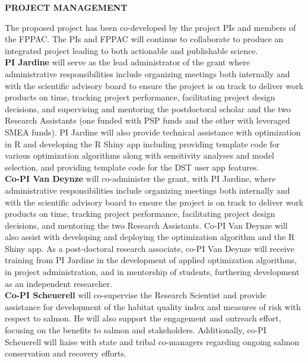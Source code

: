 \begin{center} \textbf{PROJECT MANAGEMENT} \end{center}

The proposed project has been co-developed by the project PIs and members of the FPPAC. The PIs and FPPAC will continue to collaborate to produce an integrated project leading to both actionable and publishable science. \\

\textbf{PI Jardine} will serve as the lead administrator of the grant where administrative responsibilities include organizing meetings both internally and with the scientific advisory board to ensure the project is on track to deliver work products on time, tracking project performance, facilitating project design decisions, and supervising and mentoring the postdoctoral scholar and the two Research Assistants (one funded with PSP funds and the other with leveraged SMEA funds). PI Jardine will also provide technical assistance with optimization in R and developing the R Shiny app including providing template code for various optimization algorithms along with sensitivity analyses and model selection, and providing template code for the DST user app features.\\

\textbf{Co-PI Van Deynze} will co-administer the grant, with PI Jardine, where administrative responsibilities include organizing meetings both internally and with the scientific advisory board to ensure the project is on track to deliver work products on time, tracking project performance, facilitating project design decisions, and mentoring the two Research Assistants. Co-PI Van Deynze will also assist with developing and deploying the optimization algorithm and the R Shiny app. As a post-doctoral research associate, co-PI Van Deynze will receive training from PI Jardine in the development of applied optimization algorithms, in project administration, and in mentorship of students, furthering development as an independent researcher. \\

\textbf{Co-PI Scheuerell} will co-supervise the Research Scientist and provide assistance for development of the habitat quality index and measures of risk with respect to salmon. He will also support the engagement and outreach effort, focusing on the benefits to salmon and stakeholders. Additionally, co-PI Scheuerell will liaise with state and tribal co-managers regarding ongoing salmon conservation and recovery efforts.\\



